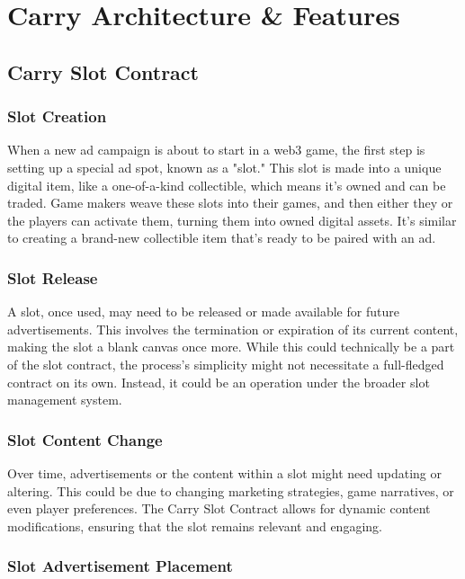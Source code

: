 \section{Carry Architecture \& Features }

\subsection{Carry Slot Contract}

\subsubsection{Slot Creation}

When a new ad campaign is about to start in a web3 game, the first step is setting up a special ad spot, known as a "slot." This slot is made into a unique digital item, like a one-of-a-kind collectible, which means it's owned and can be traded. Game makers weave these slots into their games, and then either they or the players can activate them, turning them into owned digital assets. It's similar to creating a brand-new collectible item that's ready to be paired with an ad.

\subsubsection{Slot Release}

A slot, once used, may need to be released or made available for future advertisements. This involves the termination or expiration of its current content, making the slot a blank canvas once more. While this could technically be a part of the slot contract, the process's simplicity might not necessitate a full-fledged contract on its own. Instead, it could be an operation under the broader slot management system.


\subsubsection{Slot Content Change}

Over time, advertisements or the content within a slot might need updating or altering. This could be due to changing marketing strategies, game narratives, or even player preferences. The Carry Slot Contract allows for dynamic content modifications, ensuring that the slot remains relevant and engaging.

\subsubsection{Slot Advertisement Placement}

